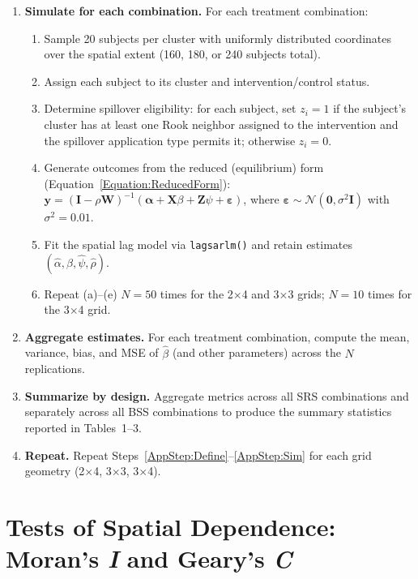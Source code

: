 \documentclass{article}[11pt]
\begin{document}
\begin{enumerate}
    \item\label{AppStep:Sim} \textbf{Simulate for each combination.} For each treatment combination:
    \begin{enumerate}
        \item Sample 20 subjects per cluster with uniformly distributed coordinates over the spatial extent (160, 180, or 240 subjects total).
        \item Assign each subject to its cluster and intervention/control status.
        \item Determine spillover eligibility: for each subject, set $z_i = 1$ if the subject's cluster has at least one Rook neighbor assigned to the intervention and the spillover application type permits it; otherwise $z_i = 0$.
        \item Generate outcomes from the reduced (equilibrium) form (Equation~\ref{Equation:ReducedForm}): $\mathbf{y} = (\mathbf{I}-\rho \mathbf{W})^{-1}(\boldsymbol\alpha + \mathbf{X}\beta + \mathbf{Z}\psi + \boldsymbol\varepsilon)$, where $\boldsymbol\varepsilon \sim \mathcal{N}(\mathbf{0}, \sigma^2\mathbf{I})$ with $\sigma^2 = 0.01$.
        \item Fit the spatial lag model via \texttt{lagsarlm()} and retain estimates $(\hat\alpha, \hat\beta, \hat\psi, \hat\rho)$.
        \item Repeat (a)--(e) $N = 50$ times for the 2$\times$4 and 3$\times$3 grids; $N = 10$ times for the 3$\times$4 grid.
    \end{enumerate}

    \item \textbf{Aggregate estimates.} For each treatment combination, compute the mean, variance, bias, and MSE of $\hat\beta$ (and other parameters) across the $N$ replications.

    \item \textbf{Summarize by design.} Aggregate metrics across all SRS combinations and separately across all BSS combinations to produce the summary statistics reported in Tables~1--3.

    \item\label{AppStep:Repeat} \textbf{Repeat.} Repeat Steps~\ref{AppStep:Define}--\ref{AppStep:Sim} for each grid geometry (2$\times$4, 3$\times$3, 3$\times$4).
\end{enumerate}

\section{Tests of Spatial Dependence: Moran's \textit{I} and Geary's \textit{C}}\label{appendix:MoransI}
\end{document}

